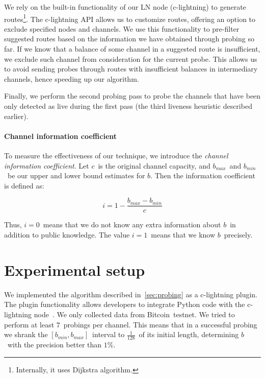 We rely on the built-in functionality of our LN node (c-lightning) to generate routes\footnote{Internally, it uses Dijkstra algorithm.}.
The c-lightning API allows us to customize routes, offering an option to exclude specified nodes and channels.
We use this functionality to pre-filter suggested routes based on the information we have obtained through probing so far.
If we know that a balance of some channel in a suggested route is insufficient, we exclude such channel from consideration for the current probe.
This allows us to avoid sending probes through routes with insufficient balances in intermediary channels, hence speeding up our algorithm.

Finally, we perform the second probing pass to probe the channels that have been only detected as live during the first pass (the third liveness heuristic described earlier).

\paragraph{Channel information coefficient}
To measure the effectiveness of our technique, we introduce the \textit{channel information coefficient}.
Let $c$~is the original channel capacity, and $b_{max}$~and $b_{min}$~be our upper and lower bound estimates for $b$.
Then the information coefficient is defined as:

\[i = 1 - \frac{b_{max} - b_{min}}{c}\]

Thus, $i = 0$~means that we do not know any extra information about $b$~in addition to public knowledge.
The value $i = 1$~means that we know $b$~precisely.


\section{Experimental setup}

We implemented the algorithm described in~\cref{sec:probing} as a c-lightning plugin.
The plugin functionality allows developers to integrate Python code with the c-lightning node~\cite{clightningPlugins}.
We only collected data from Bitcoin~testnet.
We tried to perform at least $7$~probings per channel.
This means that in a successful probing we shrank the $[b_{min}, b_{max}]$~interval to $\frac{1}{128}$~of its initial length, determining $b$~with the precision better than $1$\%.

